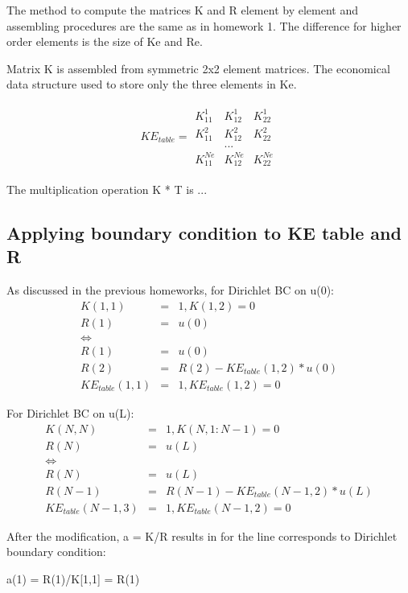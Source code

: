 \documentclass[paper=a4, fontsize=11pt]{article} %
\begin{document}
The method to compute the matrices K and R element by element and assembling procedures are the same as in homework 1. The difference for higher order elements is the size of Ke and Re.   

Matrix K is assembled from symmetric 2x2 element matrices. The economical data structure used to store only the three elements in Ke.

\begin{eqnarray}
KE_{table} = 
\begin{matrix}
K_{11}^1& K_{12}^1& K_{22}^1 \\
K_{11}^2& K_{12}^2& K_{22}^2 \\
 &...&\\
K_{11}^{Ne}& K_{12}^{Ne}& K_{22}^{Ne}         
\end{matrix}
\end{eqnarray}

The multiplication operation K * T is ...
 
\subsection{Applying boundary condition to KE table and R}

As discussed in the previous homeworks, for Dirichlet BC on u(0):
\begin{align*}
K(1,1)& =&1, K(1, 2) =0 \\
R(1) &=& u(0)\\
\Longleftrightarrow\\
R(1)&=&u(0)\\
R(2)&=&R(2)-KE_{table} (1,2) * u(0)\\
KE_{table} (1, 1)& =&1, KE_{table} (1, 2) =0
\end{align*}

For Dirichlet BC on u(L):
\begin{align*}
K(N,N) &=&1,K(N, 1:N-1) =0\\ 
R(N) &=& u(L) \\
\Longleftrightarrow\\
R(N)&=&u(L)\\
R(N-1)&=&R(N-1)-KE_{table} (N-1,2) * u(L)\\
KE_{table} (N-1, 3)& =&1, KE_{table} (N-1, 2) =0
\end{align*}



After the modification, a = K/R results in for the line corresponds to Dirichlet boundary condition: 

a(1) = R(1)/K[1,1] = R(1)
\end{document}

